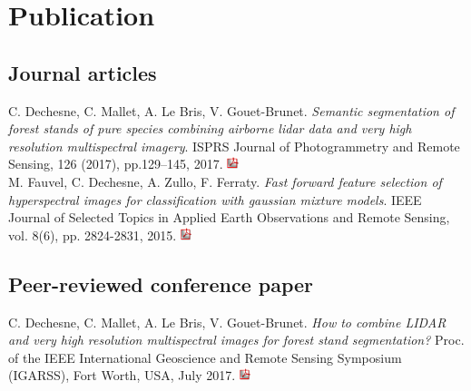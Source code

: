 
\chapter{Publication} %

\label{Publication} %

\startcontents[chapters]
\Mprintcontents


\section{Journal articles}

C. Dechesne, C. Mallet, A. Le Bris, V. Gouet-Brunet. \textit{Semantic segmentation of forest stands of pure species combining airborne lidar data and very high resolution multispectral imagery}. ISPRS Journal of Photogrammetry and Remote Sensing, 126 (2017), pp.129–145, 2017. \href{http://recherche.ign.fr/labos/matis/pdf/articles_revues/2017/semantic_segmentation.pdf}{\includegraphics[height=10pt]{Appendices/ic_pdf.jpg}} \\

M. Fauvel, C. Dechesne, A. Zullo, F. Ferraty. \textit{Fast forward feature selection of hyperspectral images for classification with gaussian mixture models}. IEEE Journal of Selected Topics in Applied Earth Observations and Remote Sensing, vol. 8(6), pp. 2824-2831, 2015. \href{https://arxiv.org/pdf/1501.00857v1.pdf}{\includegraphics[height=10pt]{Appendices/ic_pdf.jpg}} \\

\section{Peer-reviewed conference paper}

C. Dechesne, C. Mallet, A. Le Bris, V. Gouet-Brunet. \textit{How to combine LIDAR and very high resolution multispectral images for forest stand segmentation?} Proc. of the IEEE International Geoscience and Remote Sensing Symposium (IGARSS), Fort Worth, USA, July 2017. \href{http://recherche.ign.fr/labos/matis/pdf/articles_conf/2017/IGARSS_2017_Dechesne_Clement_final.pdf}{\includegraphics[height=10pt]{Appendices/ic_pdf.jpg}} \\

